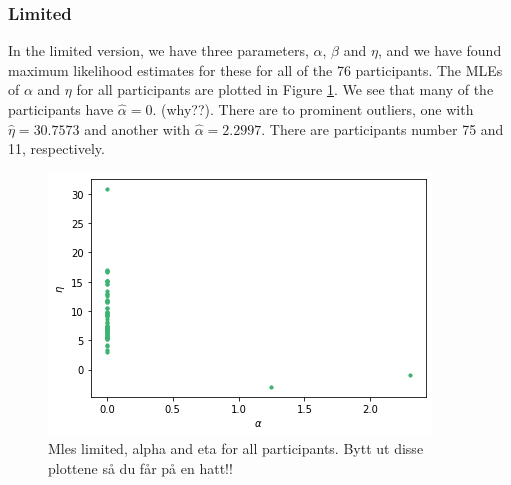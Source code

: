 \subsubsection{Limited}
In the limited version, we have three parameters, $\alpha$, $\beta$ and $\eta$, and we have found maximum likelihood estimates for these for all of the 76 participants. The MLEs of $\alpha$ and $\eta$ for all participants are plotted in Figure \ref{fig:mles_limited_alpha_eta}. We see that many of the participants have $\hat{\alpha}=0$. (why??). 
There are to prominent outliers, one with $\hat{\eta}=30.7573$ and another with $\hat{\alpha}=2.2997$. There are participants number 75 and 11, respectively. 
\begin{figure}
    \centering
    \includegraphics[scale=0.7]{pictures/plotted_mles_limited_alpha_eta_gk1.png}
    \caption{Mles limited, alpha and eta for all participants. Bytt ut disse plottene så du får på en hatt!!}
    \label{fig:mles_limited_alpha_eta}
\end{figure}


